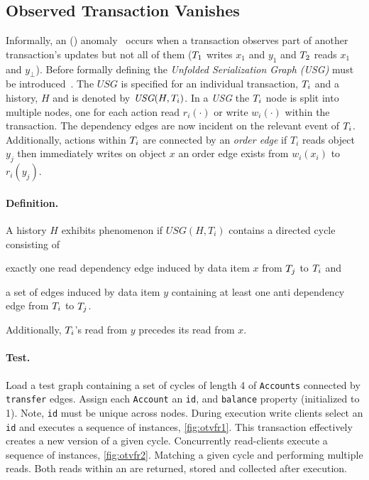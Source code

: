 \subsection{Observed Transaction Vanishes}
\label{sec:observ-trans-vanish}

Informally, an  () 
anomaly~\cite{DBLP:journals/pvldb/BailisDFGHS13} occurs when a transaction 
observes part of another transaction's updates but not all of them 
(\eg $T_1$ writes $x_1$ and $y_1$ and $T_2$ reads $x_1$ and $y_\bot$).
Before formally defining  the \emph{Unfolded Serialization Graph (USG)} 
must be introduced~\cite{adya1999weak}. The $\textit{USG}$ is specified for an 
individual transaction, $T_i$ and a history, $H$ and is denoted by 
$\textit{USG}(H,T_i)$. In a \emph{USG} the $T_i$ node is split into 
multiple nodes, one for each action read $r_i(\cdot)$ or  write $w_i(\cdot)$  
within the transaction. The dependency edges are now incident on the relevant 
event of $T_i$. Additionally, actions within $T_i$ are connected by 
an \emph{order edge} \eg if $T_i$ reads object $y_j$ then immediately writes on 
object $x$ an order edge exists from $w_i(x_i)$ to $r_i(y_j)$.

\paragraph{Definition.}
A history $H$ exhibits phenomenon  if $\textit{USG}(H,T_i)$ 
contains a directed cycle consisting of 
\begin{enumerate*}[label={(\roman*)}]
  \item exactly one read dependency edge induced by data item $x$ from 
        $T_j$ to $T_i$ and
  \item a set of edges induced by data item $y$ containing at least one anti 
        dependency edge from $T_i$ to $T_j$.
\end{enumerate*}
Additionally, $T_i$'s read from $y$ precedes its read from $x$.

\paragraph{Test.}
Load a test graph containing a set of cycles of length 4 of \texttt{Accounts} 
connected by \texttt{transfer} edges. Assign each \texttt{Account} an \texttt{id}, 
and \texttt{balance} property (initialized to 1). Note, \texttt{id} must be 
unique across nodes. During execution write clients select an \texttt{id} and 
executes a sequence of  instances, \autoref{fig:otvfr1}.
This transaction effectively creates a new version of a given cycle. Concurrently 
read-clients execute a sequence of  instances, \autoref{fig:otvfr2}.
Matching a given cycle and performing multiple reads. Both reads within an 
 are returned, stored and collected after execution.

